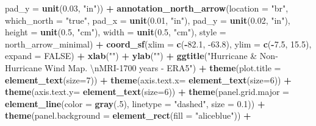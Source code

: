 \documentclass[12pt,oneside]{reedthesis}
\newenvironment{Shaded}{\begin{snugshade}}{\end{snugshade}}
\newcommand{\CharTok}[1]{\textcolor[rgb]{0.31,0.60,0.02}{#1}}
\newcommand{\DataTypeTok}[1]{\textcolor[rgb]{0.13,0.29,0.53}{#1}}
\newcommand{\DecValTok}[1]{\textcolor[rgb]{0.00,0.00,0.81}{#1}}
\newcommand{\FloatTok}[1]{\textcolor[rgb]{0.00,0.00,0.81}{#1}}
\newcommand{\KeywordTok}[1]{\textcolor[rgb]{0.13,0.29,0.53}{\textbf{#1}}}
\newcommand{\NormalTok}[1]{#1}
\newcommand{\OperatorTok}[1]{\textcolor[rgb]{0.81,0.36,0.00}{\textbf{#1}}}
\newcommand{\OtherTok}[1]{\textcolor[rgb]{0.56,0.35,0.01}{#1}}
\newcommand{\StringTok}[1]{\textcolor[rgb]{0.31,0.60,0.02}{#1}}
\begin{document}
\begin{Shaded}
\begin{Highlighting}[]
   \DataTypeTok{pad_y =} \KeywordTok{unit}\NormalTok{(}\FloatTok{0.03}\NormalTok{, }\StringTok{"in"}\NormalTok{)) }\OperatorTok{+}\StringTok{ }
\StringTok{  }\KeywordTok{annotation_north_arrow}\NormalTok{(}\DataTypeTok{location =} \StringTok{"br"}\NormalTok{, }\DataTypeTok{which_north =} \StringTok{"true"}\NormalTok{, }\DataTypeTok{pad_x =} \KeywordTok{unit}\NormalTok{(}\FloatTok{0.01}\NormalTok{, }\StringTok{"in"}\NormalTok{), }\DataTypeTok{pad_y =} \KeywordTok{unit}\NormalTok{(}\FloatTok{0.02}\NormalTok{, }\StringTok{"in"}\NormalTok{), }\DataTypeTok{height =} \KeywordTok{unit}\NormalTok{(}\FloatTok{0.5}\NormalTok{, }\StringTok{"cm"}\NormalTok{), }
   \DataTypeTok{width =} \KeywordTok{unit}\NormalTok{(}\FloatTok{0.5}\NormalTok{, }\StringTok{"cm"}\NormalTok{), }\DataTypeTok{style =}\NormalTok{ north_arrow_minimal) }\OperatorTok{+}
\StringTok{  }\KeywordTok{coord_sf}\NormalTok{(}\DataTypeTok{xlim =} \KeywordTok{c}\NormalTok{(}\OperatorTok{-}\FloatTok{82.1}\NormalTok{, }\FloatTok{-63.8}\NormalTok{), }\DataTypeTok{ylim =} \KeywordTok{c}\NormalTok{(}\OperatorTok{-}\FloatTok{7.5}\NormalTok{, }\FloatTok{15.5}\NormalTok{), }\DataTypeTok{expand =} \OtherTok{FALSE}\NormalTok{) }\OperatorTok{+}
\StringTok{  }\KeywordTok{xlab}\NormalTok{(}\StringTok{""}\NormalTok{) }\OperatorTok{+}\StringTok{ }
\StringTok{  }\KeywordTok{ylab}\NormalTok{(}\StringTok{""}\NormalTok{) }\OperatorTok{+}\StringTok{ }
\StringTok{  }\KeywordTok{ggtitle}\NormalTok{(}\StringTok{"Hurricane & Non-Hurricane Wind Map. }\CharTok{\textbackslash{}n}\StringTok{MRI-1700 years - ERA5"}\NormalTok{) }\OperatorTok{+}\StringTok{ }
\StringTok{  }\KeywordTok{theme}\NormalTok{(}\DataTypeTok{plot.title =} \KeywordTok{element_text}\NormalTok{(}\DataTypeTok{size=}\DecValTok{7}\NormalTok{)) }\OperatorTok{+}
\StringTok{  }\KeywordTok{theme}\NormalTok{(}\DataTypeTok{axis.text.x=} \KeywordTok{element_text}\NormalTok{(}\DataTypeTok{size=}\DecValTok{6}\NormalTok{)) }\OperatorTok{+}\StringTok{ }
\StringTok{  }\KeywordTok{theme}\NormalTok{(}\DataTypeTok{axis.text.y=} \KeywordTok{element_text}\NormalTok{(}\DataTypeTok{size=}\DecValTok{6}\NormalTok{)) }\OperatorTok{+}
\StringTok{  }\KeywordTok{theme}\NormalTok{(}\DataTypeTok{panel.grid.major =} \KeywordTok{element_line}\NormalTok{(}\DataTypeTok{color =} \KeywordTok{gray}\NormalTok{(.}\DecValTok{5}\NormalTok{), }\DataTypeTok{linetype =} \StringTok{"dashed"}\NormalTok{, }\DataTypeTok{size =} \FloatTok{0.1}\NormalTok{)) }\OperatorTok{+}
\StringTok{  }\KeywordTok{theme}\NormalTok{(}\DataTypeTok{panel.background =} \KeywordTok{element_rect}\NormalTok{(}\DataTypeTok{fill =} \StringTok{"aliceblue"}\NormalTok{)) }\OperatorTok{+}

\end{Highlighting}
\end{Shaded}
\end{document}
